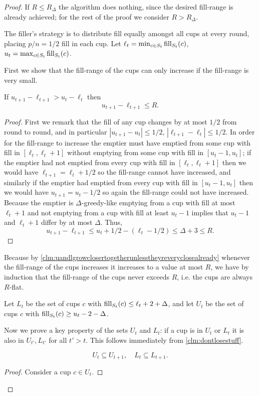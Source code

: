 \begin{proof}
  If $R \le R_\Delta$ the algorithm does nothing, since the
  desired fill-range is already achieved; for
  the rest of the proof we consider $R > R_\Delta$.

  The filler's strategy is to distribute fill equally amongst all
  cups at every round, placing $p/n = 1/2$ fill in each cup. 
  Let $\ell_t = \min_{c\in S_t} \operatorname{\textnormal{fill}}_{S_t}(c)$, $u_t = \max_{c\in S_t} \operatorname{\textnormal{fill}}_{S_t}(c)$. 

  First we show that the fill-range of the cups can only increase
  if the fill-range is very small.
  \begin{clm}
    \label{clm:uandlgrowclosertogetherunlesstheyreveryclosealready}
    If $u_{t+1}-\ell_{t+1} > u_t - \ell_t$ then 
    $$u_{t+1} - \ell_{t+1} \le R.$$
  \end{clm}
  \begin{proof}
    First we remark that the fill of any cup changes by at most
    $1/2$ from round to round, and in particular $|u_{t+1}-u_t|
    \le 1/2$, $|\ell_{t+1} - \ell_t|\le 1/2$.
  In order for the fill-range to increase the emptier must have
  emptied from some cup with fill in $[\ell_t, \ell_t + 1]$ without
  emptying from some cup with fill in $[u_t-1, u_t]$; if the emptier
  had not emptied from every cup with fill in $[\ell_t, \ell_t+1]$
  then we would have $\ell_{t+1} = \ell_t + 1/2$ so the
  fill-range cannot have increased, and similarly if the emptier
  had emptied from every cup with fill in $[u_t-1, u_t]$ then we
  would have $u_{t+1} = u_t - 1/2$ so again the fill-range could
  not have increased. Because the emptier is $\Delta$-greedy-like
  emptying from a cup with fill at most $\ell_t+1$ and not
  emptying from a cup with fill at least $u_t-1$ implies that
  $u_t-1$ and $\ell_t+1$ differ by at most $\Delta$.
  Thus, 
  $$u_{t+1} - \ell_{t+1} \le u_t +1/2 - (\ell_t -1/2)  \le \Delta + 3 \le R.$$
  \end{proof}
  Because by \cref{clm:uandlgrowclosertogetherunlesstheyreveryclosealready}
  whenever the fill-range of the cups increases it increases to a
  value at most $R$, we have by induction that the fill-range of
  the cups never exceeds $R$, i.e. the cups are always $R$-flat.

  Let $L_t$ be the set of cups $c$ with $\operatorname{\textnormal{fill}}_{S_t}(c) \le \ell_t+2+\Delta$, and let
  $U_t$ be the set of cups $c$ with $\operatorname{\textnormal{fill}}_{S_t}(c) \ge u_t-2-\Delta$.

  Now we prove a key property of the sets $U_t$ and $L_t$: if a cup is in
  $U_t$ or $L_t$ it is also in $U_{t'}, L_{t'}$ for all $t' > t$. This
  follows immediately from \cref{clm:dontlosestuff}.
  \begin{clm}
    \label{clm:dontlosestuff}
    $$U_{t} \subseteq U_{t+1},\quad L_t \subseteq L_{t+1}.$$
  \end{clm}
  \begin{proof}
    Consider a cup $c\in U_t$.


\end{proof}
\end{proof}
